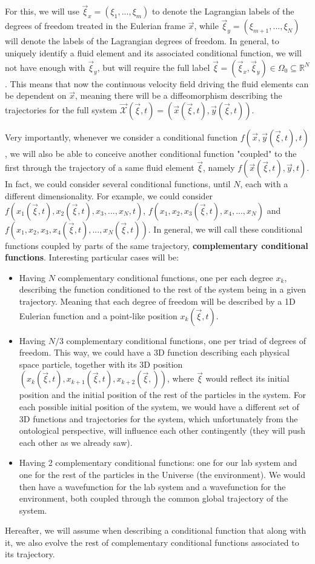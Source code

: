 \documentclass[11pt, a4paper]{article} %
\newcommand{\R}{\mathbb{R}} %
\newcommand{\x}{\mathcal{X}}
\begin{document}
For this, we will use $\vec{\xi}_x=(\xi_1,...,\xi_m)$ to denote the Lagrangian labels of the degrees of freedom treated in the Eulerian frame $\vec{x}$, while $\vec{\xi}_y=(\xi_{m+1},...,\xi_N)$ will denote the labels of the Lagrangian degrees of freedom. In general, to uniquely identify a fluid element and its associated conditional function, we will not have enough with $\vec{\xi}_y$, but will require the full label $\vec{\xi}=(\vec{\xi}_x,\vec{\xi}_y)\in \Omega_0\subseteq\R^N$. This means that now the continuous velocity field driving the fluid elements can be dependent on $\vec{x}$, meaning there will be a diffeomorphism describing the trajectories for the full system $\vec{\x}(\vec{\xi},t)=(\vec{x}(\vec{\xi},t), \vec{y}(\vec{\xi},t))$. 

Very importantly, whenever we consider a conditional function $f(\vec{x},\vec{y}(\vec{\xi},t),t)$, we will also be able to conceive another conditional function "coupled" to the first through the trajectory of a same fluid element $\vec{\xi}$, namely $f(\vec{x}(\vec{\xi},t),\vec{y},t)$. In fact, we could consider several conditional functions, until $N$, each with a different dimensionality. For example, we could consider $f(x_1(\vec{\xi},t),x_2(\vec{\xi},t),x_3,...,x_N,t)$, $f(x_1, x_2, x_3(\vec{\xi},t), x_4,...,x_N)$ and $f(x_1, x_2, x_3, x_4(\vec{\xi},t),...,x_N(\vec{\xi},t))$. In general, we will call these conditional functions coupled by parts of the same trajectory, {\bf complementary conditional functions}. Interesting particular cases will be:
\begin{itemize}
\item Having $N$ complementary conditional functions, one per each degree $x_k$, describing the function conditioned to the rest of the system being in a given trajectory. Meaning that each degree of freedom will be described by a 1D Eulerian function and a point-like position $x_k(\vec{\xi},t)$.
\item Having $N/3$ complementary conditional functions, one per triad of degrees of freedom. This way, we could have a 3D function describing each physical space particle, together with its 3D position $(x_{k}(\vec{\xi},t), x_{k+1}(\vec{\xi},t),x_{k+2}(\vec{\xi},))$, where $\vec{\xi}$ would reflect its initial position and the initial position of the rest of the particles in the system. For each possible initial position of the system, we would have a different set of 3D functions and trajectories for the system, which unfortunately from the ontological perspective, will influence each other contingently (they will push each other as we already saw).
\item Having 2 complementary conditional functions: one for our lab system and one for the rest of the particles in the Universe (the environment). We would then have a wavefunction for the lab system and a wavefunction for the environment, both coupled through the common global trajectory of the system.
\end{itemize} 
Hereafter, we will assume when describing a conditional function that along with it, we also evolve the rest of complementary conditional functions associated to its trajectory.
\end{document}
